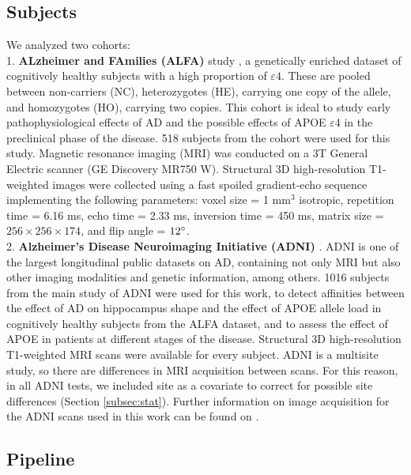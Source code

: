 \subsection{Subjects}

We analyzed two cohorts: \\

1. \textbf{ALzheimer and FAmilies (ALFA)} study \cite{Molinuevo2016}, a genetically enriched dataset of cognitively healthy subjects with a high proportion of $\varepsilon4$. These are pooled between non-carriers (NC), heterozygotes (HE), carrying one copy of the allele, and homozygotes (HO), carrying two copies. This cohort is ideal to study early pathophysiological effects of AD and the possible effects of APOE $\varepsilon$4 in the preclinical phase of the disease. 518 subjects from the cohort were used for this study. Magnetic resonance imaging (MRI) was conducted on a 3T General Electric scanner (GE Discovery MR750 W). Structural 3D high-resolution T1-weighted images were collected using a fast spoiled gradient-echo sequence implementing the following parameters: voxel size = 1 mm$^3$ isotropic, repetition time = 6.16 ms, echo time = 2.33 ms, inversion time = 450 ms, matrix size = $256 \times 256 \times 174$, and flip angle = $12\degree$. \\

2. \textbf{Alzheimer's Disease Neuroimaging Initiative (ADNI)} \cite{Mueller2005}. ADNI is one of the largest longitudinal public datasets on AD, containing not only MRI but also other imaging modalities and genetic information, among others. 1016 subjects from the main study of ADNI were used for this work, to detect affinities between the effect of AD on hippocampus shape and the effect of APOE allele load in cognitively healthy subjects from the ALFA dataset, and to assess the effect of APOE in patients at different stages of the disease. Structural 3D high-resolution T1-weighted MRI scans were available for every subject. ADNI is a multisite study, so there are differences in MRI acquisition between scans. For this reason, in all ADNI tests, we included site as a covariate to correct for possible site differences (Section \ref{subsec:stat}). Further information on image acquisition for the ADNI scans used in this work can be found on \cite{Jack2010a}. \\

\subsection{Pipeline}
\label{sec:pipeline}

